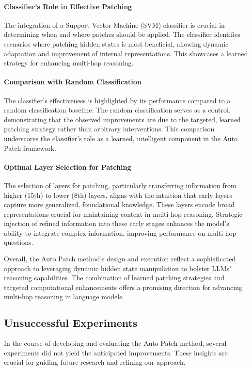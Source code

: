 \documentclass[11pt]{article}
\begin{document}
\paragraph{Classifier's Role in Effective Patching} The integration of a Support Vector Machine (SVM) classifier is crucial in determining when and where patches should be applied. The classifier identifies scenarios where patching hidden states is most beneficial, allowing dynamic adaptation and improvement of internal representations. This showcases a learned strategy for enhancing multi-hop reasoning.

\paragraph{Comparison with Random Classification} The classifier’s effectiveness is highlighted by its performance compared to a random classification baseline. The random classification serves as a control, demonstrating that the observed improvements are due to the targeted, learned patching strategy rather than arbitrary interventions. This comparison underscores the classifier's role as a learned, intelligent component in the Auto Patch framework.

\paragraph{Optimal Layer Selection for Patching} The selection of layers for patching, particularly transferring information from higher (15th) to lower (8th) layers, aligns with the intuition that early layers capture more generalized, foundational knowledge. These layers encode broad representations crucial for maintaining context in multi-hop reasoning. Strategic injection of refined information into these early stages enhances the model's ability to integrate complex information, improving performance on multi-hop questions.

Overall, the Auto Patch method's design and execution reflect a sophisticated approach to leveraging dynamic hidden state manipulation to bolster LLMs' reasoning capabilities. The combination of learned patching strategies and targeted computational enhancements offers a promising direction for advancing multi-hop reasoning in language models.

\subsection{Unsuccessful Experiments}
In the course of developing and evaluating the Auto Patch method, several experiments did not yield the anticipated improvements. These insights are crucial for guiding future research and refining our approach.
\end{document}
